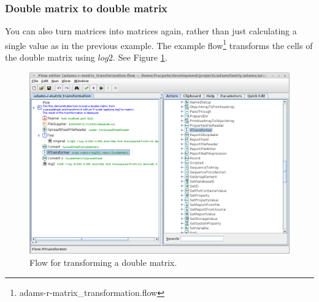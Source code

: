 \documentclass[a4paper]{book}
\begin{document}
\subsubsection{Double matrix to double matrix}
You can also turn matrices into matrices again, rather than just calculating a 
single value as in the previous example. The example
flow\footnote{adams-r-matrix\_transformation.flow} transforms the cells
of the double matrix using $log2$. See Figure \ref{matrix_transformation-flow}.
\begin{figure}[ht]
	\centering
	\includegraphics[width=12cm]{images/matrix_transformation-flow.png}
	\caption{Flow for transforming a double matrix.}
	\label{matrix_transformation-flow}
\end{figure}

\clearpage
\end{document}
